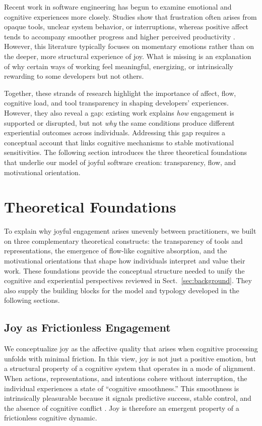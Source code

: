 \documentclass[12pt]{elsarticle}
\begin{document}
Recent work in software engineering has begun to examine emotional and cognitive 
experiences more closely. Studies show that frustration often arises from 
opaque tools, unclear system behavior, or interruptions, whereas positive affect 
tends to accompany smoother progress and higher perceived productivity 
\cite{ford2015exploring}. However, this literature typically focuses on momentary 
emotions rather than on the deeper, more structural experience of joy. What is 
missing is an explanation of why certain ways of working feel meaningful, energizing, 
or intrinsically rewarding to some developers but not others.

Together, these strands of research highlight the importance of affect, 
flow, cognitive load, and tool transparency in shaping developers’ experiences. 
However, they also reveal a gap: existing work explains \emph{how} engagement 
is supported or disrupted, but not \emph{why} the same conditions produce 
different experiential outcomes across individuals. Addressing this gap 
requires a conceptual account that links cognitive mechanisms to stable 
motivational sensitivities. The following section introduces the three theoretical foundations that underlie our model of joyful software creation: transparency, flow, and motivational orientation.



\section{Theoretical Foundations}\label{sec:foundations}
To explain why joyful engagement arises unevenly between practitioners, we built 
on three complementary theoretical constructs: the transparency of tools and 
representations, the emergence of flow-like cognitive absorption, and the 
motivational orientations that shape how individuals interpret and value their 
work. These foundations provide the conceptual structure needed to unify the 
cognitive and experiential perspectives reviewed in Sect.~\ref{sec:background}. 
They also supply the building blocks for the model and typology developed in 
the following sections.


\subsection{Joy as Frictionless Engagement}

We conceptualize joy as the affective quality that arises when cognitive
processing unfolds with minimal friction. In this view, joy is not just a
positive emotion, but a structural property of a cognitive system that
operates in a mode of alignment. When actions, representations, and intentions cohere
without interruption, the individual experiences a state of ``cognitive
smoothness.'' This smoothness is intrinsically pleasurable because it signals
predictive success, stable control, and the absence of cognitive conflict
\cite{berridge2012}. Joy is therefore an emergent property of a frictionless
cognitive dynamic.
\end{document}
